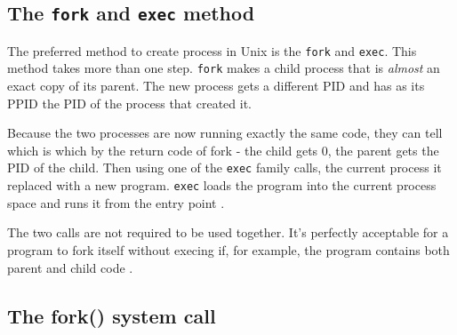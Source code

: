 \documentclass[a4paper]{article}
\begin{document}
\subsection{The \texttt{fork} and \texttt{exec} method}

The preferred method to create process in Unix is the \texttt{fork} and \texttt{exec}. This method takes more than one step. \texttt{fork} makes a child process that is \textit{almost} an exact copy of its parent. The new process gets a different PID and has as its PPID the PID of the process that created it.

Because the two processes are now running exactly the same code, they can tell which is which by the return code of fork - the child gets 0, the parent gets the PID of the child.   Then using one of the \texttt{exec} family calls, the current process it replaced with a new program. \texttt{exec} loads the program into the current process space and runs it from the entry point \cite{stflowforkexec}.

The two calls are not required to be used together. It's perfectly acceptable for a program to fork itself without execing if, for example, the program contains both parent and child code \cite{stflowforkexec}.




\subsection{The fork() system call}
\end{document}
